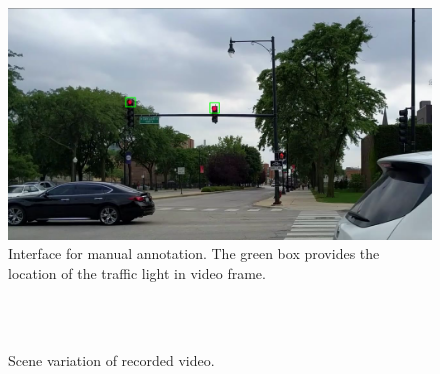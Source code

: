 \begin{figure}[ht!]
\centering
\includegraphics[width=5.2in]{images/annotation.png}
\caption{Interface for manual annotation. The green box provides the location of the traffic light in video frame.}
\label{f:annotate}
\end{figure}

\begin{figure}[!ht]
\centering
{}\\
\\
\caption{Scene variation of recorded video.}
\label{f:dataset}
\end{figure}

